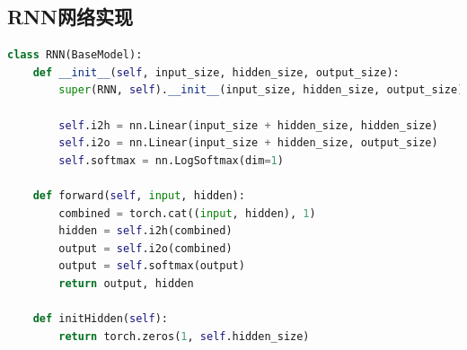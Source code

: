 \documentclass[a4paper]{article}
\begin{document}
\subsection{RNN网络实现}
\begin{lstlisting}[language=Python, caption=RNN网络完整实现]
class RNN(BaseModel):
    def __init__(self, input_size, hidden_size, output_size):
        super(RNN, self).__init__(input_size, hidden_size, output_size)
        
        self.i2h = nn.Linear(input_size + hidden_size, hidden_size)
        self.i2o = nn.Linear(input_size + hidden_size, output_size)
        self.softmax = nn.LogSoftmax(dim=1)

    def forward(self, input, hidden):
        combined = torch.cat((input, hidden), 1)
        hidden = self.i2h(combined)
        output = self.i2o(combined)
        output = self.softmax(output)
        return output, hidden

    def initHidden(self):
        return torch.zeros(1, self.hidden_size)
\end{lstlisting}
\end{document}
